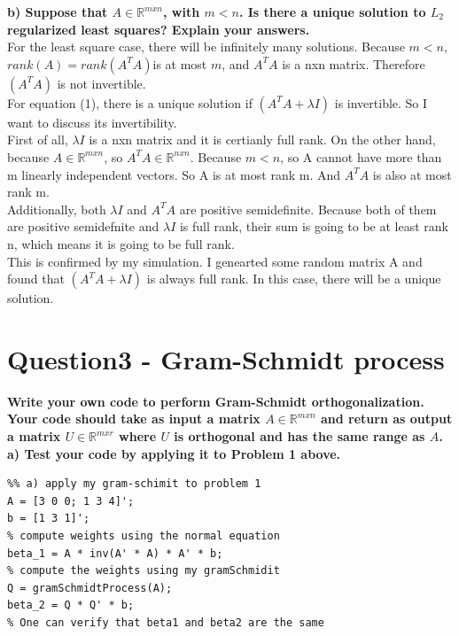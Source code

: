 \documentclass[paper=a4, fontsize=11pt]{scrartcl} %
\numberwithin{equation}{section} %
\numberwithin{figure}{section} %
\numberwithin{table}{section} %
\begin{document}
\textbf{b) Suppose that $A \in \mathbb{R}^{mxn}$, with $m < n$. Is there a unique solution to $L_2$ regularized least squares? Explain your answers.}\\

For the least square case, there will be infinitely many solutions. Because $m<n$, $rank(A) = rank (A^TA)$is at most $m$, and $A^TA$ is a nxn matrix. Therefore $(A^TA)$ is not invertible. \\

For equation (1), there is a unique solution if $(A^TA + \lambda I)$ is invertible. So I want to discuss its invertibility. \\
First of all, $\lambda I$ is a nxn matrix and it is certianly full rank. On the other hand, because $A \in \mathbb{R}^{mxn}$, so $A^TA \in \mathbb{R}^{nxn}$. Because $m < n$, so A cannot have more than m linearly independent vectors. So A is at most rank m. And $A^TA$ is also at most rank m. \\
Additionally, both $\lambda I$ and $A^TA$ are positive semidefinite. Because both of them are positive semidefnite and $\lambda I$ is full rank, their sum is going to be at least rank n, which means it is going to be full rank. \\
This is confirmed by my simulation. I genearted some random matrix A and found that $(A^TA + \lambda I)$ is always full rank. In this case, there will be a unique solution. \\



\newpage

\section*{Question3 - Gram-Schmidt process}
\textbf{Write your own code to perform Gram-Schmidt orthogonalization. Your code should take as input a matrix $A \in \mathbb{R}^{mxn}$ and return as output a matrix $U \in \mathbb{R}^{mxr}$ where $U$ is orthogonal and has the same range as $A$.}\\
\textbf{a) Test your code by applying it to Problem 1 above.}\\

\begin{lstlisting}
%% a) apply my gram-schimit to problem 1 
A = [3 0 0; 1 3 4]';
b = [1 3 1]';
% compute weights using the normal equation
beta_1 = A * inv(A' * A) * A' * b;
% compute the weights using my gramSchmidit 
Q = gramSchmidtProcess(A);
beta_2 = Q * Q' * b;
% One can verify that beta1 and beta2 are the same 
\end{lstlisting}
\end{document}
